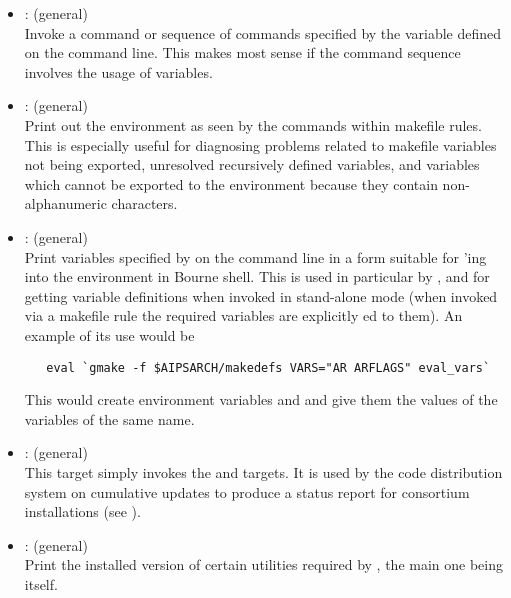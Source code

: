 \begin{itemize}
\item
    : (general)
   \\ Invoke a command or sequence of commands specified by the 
   variable defined on the  command line.  This makes most
   sense if the command sequence involves the usage of 
   variables.

\item
    : (general)
   \\ Print out the environment as seen by the commands within makefile rules.
   This is especially useful for diagnosing problems related to makefile
   variables not being exported, unresolved recursively defined variables, and
   variables which cannot be exported to the environment because they contain
   non-alphanumeric characters.

\item
    : (general)
   \\ Print variables specified by  on the  command
   line in a form suitable for 'ing into the environment in
   Bourne shell.  This is used in particular by ,
    and  for getting 
   variable definitions when invoked in stand-alone mode (when invoked via a
   makefile rule the required variables are explicitly ed to
   them).  An example of its use would be

\begin{verbatim}
   eval `gmake -f $AIPSARCH/makedefs VARS="AR ARFLAGS" eval_vars`
\end{verbatim}

   \noindent
   This would create environment variables  and  and
   give them the values of the  variables of the same name.

\item
    : (general)
   \\ This target simply invokes the  and 
   targets.  It is used by the code distribution system on cumulative updates
   to produce a status report for consortium installations (see
   ).

\item
    : (general)
   \\ Print the installed version of certain utilities required by \aipspp,
   the main one being  itself.


\end{itemize}
